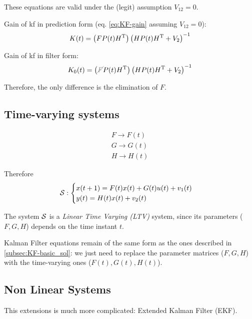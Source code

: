 \begin{remark}
    These equations are valid under the (legit) assumption $V_{12} = 0$.
\end{remark}

\begin{obs}
    Gain of \gls{kf} in prediction form (eq. \ref{eq:KF-gain} assuming $V_{12}=0$):
    \[
        K(t) = \left( FP(t)H^{\mathrm{T}} \right) \left( HP(t)H^{\mathrm{T}}+V_2 \right)^{-1}
    \]

    Gain of \gls{kf} in filter form:
    \[
        K_0(t) = \left(\textcolor{gray}{\cancel{F}} P(t)H\transpose \right) \left( HP(t)H\transpose+V_2 \right)^{-1}
    \]

    Therefore, the only difference is the elimination of $F$.
\end{obs}


\subsection{Time-varying systems}

\begin{align*}
    F \rightarrow F(t) \\
    G \rightarrow G(t) \\
    H \rightarrow H(t)
\end{align*}

Therefore
\[
    \mathcal{S}: \begin{cases}
        x(t+1) = F(t)x(t) + G(t)u(t) + v_1(t) \\
        y(t) = H(t)x(t) + v_2(t)
    \end{cases}
\]

\begin{definition} 
    The system $\mathcal{S}$ is a \emph{Linear Time Varying (LTV)} system, since its parameters ($F,G,H$) depends on the time instant $t$.
\end{definition}

Kalman Filter equations remain of the same form as the ones described in \ref{subsec:KF-basic_sol}: we just need to replace the parameter matrices ($F,G,H$) with the time-varying ones ($F(t),G(t),H(t)$).

\subsection{Non Linear Systems}

This extensions is much more complicated: Extended Kalman Filter (EKF).

